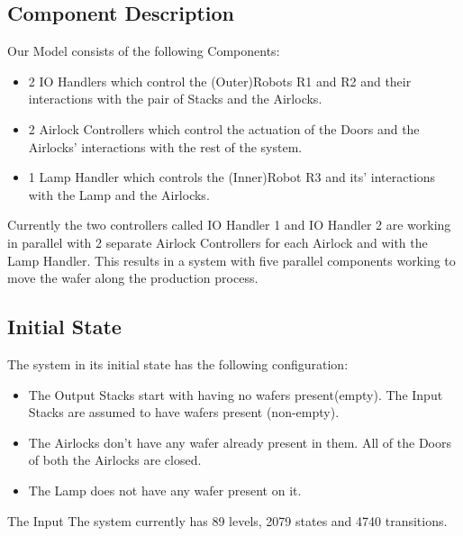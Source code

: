 \documentclass[a4paper,12pt]{article}
\begin{document}
	\subsection{Component Description}
	Our Model consists of the following Components:
	\begin{itemize}
		\item 2 IO Handlers which control the (Outer)Robots R1 and R2 and their interactions with the pair of Stacks and the Airlocks.
		\item 2 Airlock Controllers which control the actuation of the Doors and the Airlocks' interactions with the rest of the system.
		\item 1 Lamp Handler which controls the (Inner)Robot R3 and its' interactions with the Lamp and the Airlocks.
	\end{itemize}
	Currently the two controllers called IO Handler 1 and IO Handler 2 are working in parallel with 2 separate Airlock Controllers for each Airlock and with the Lamp Handler. This results in a system with five parallel components working to move the wafer along the production process. 
	\subsection{Initial State}
	The system in its initial state has the following configuration:
	\begin{itemize}
		\item The Output Stacks start with having no wafers present(empty). The Input Stacks are assumed to have wafers present (non-empty).
		\item The Airlocks don't have any wafer already present in them. All of the Doors of both the Airlocks are closed.
		\item The Lamp does not have any wafer present on it.
	\end{itemize} 
	The Input The system currently has 89 levels, 2079 states and 4740 transitions.
\end{document}
